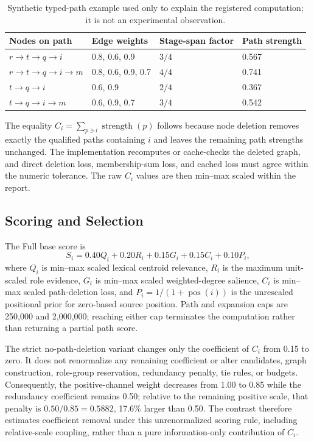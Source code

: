 \documentclass[applsci,article,submit,moreauthors]{Definitions/mdpi}
\begin{document}
\begin{table}[H]
\caption{Synthetic typed-path example used only to explain the registered computation; it is not an experimental observation.}
\label{tab:toy-path}\centering\small
\begin{tabular}{llll}
\toprule
Nodes on path & Edge weights & Stage-span factor & Path strength\\
\midrule
$r\rightarrow t\rightarrow q\rightarrow i$ & 0.8, 0.6, 0.9 & $3/4$ & 0.567\\
$r\rightarrow t\rightarrow q\rightarrow i\rightarrow m$ & 0.8, 0.6, 0.9, 0.7 & $4/4$ & 0.741\\
$t\rightarrow q\rightarrow i$ & 0.6, 0.9 & $2/4$ & 0.367\\
$t\rightarrow q\rightarrow i\rightarrow m$ & 0.6, 0.9, 0.7 & $3/4$ & 0.542\\
\bottomrule
\end{tabular}
\end{table}

The equality $C_i=\sum_{p\ni i}\operatorname{strength}(p)$ follows because node deletion removes exactly the qualified paths containing $i$ and leaves the remaining path strengths unchanged. The implementation recomputes or cache-checks the deleted graph, and direct deletion loss, membership-sum loss, and cached loss must agree within the numeric tolerance. The raw $C_i$ values are then min--max scaled within the report.

\subsection{Scoring and Selection}

The Full base score is
\begin{equation}
S_i=0.40Q_i+0.20R_i+0.15G_i+0.15C_i+0.10P_i,
\end{equation}
where $Q_i$ is min--max scaled lexical centroid relevance, $R_i$ is the maximum unit-scaled role evidence, $G_i$ is min--max scaled weighted-degree salience, $C_i$ is min--max scaled path-deletion loss, and $P_i=1/(1+\operatorname{pos}(i))$ is the unrescaled positional prior for zero-based source position. Path and expansion caps are 250,000 and 2,000,000; reaching either cap terminates the computation rather than returning a partial path score.

The strict no-path-deletion variant changes only the coefficient of $C_i$ from 0.15 to zero. It does not renormalize any remaining coefficient or alter candidates, graph construction, role-group reservation, redundancy penalty, tie rules, or budgets. Consequently, the positive-channel weight decreases from 1.00 to 0.85 while the redundancy coefficient remains 0.50; relative to the remaining positive scale, that penalty is $0.50/0.85=0.5882$, 17.6\% larger than 0.50. The contrast therefore estimates coefficient removal under this unrenormalized scoring rule, including relative-scale coupling, rather than a pure information-only contribution of $C_i$.
\end{document}
